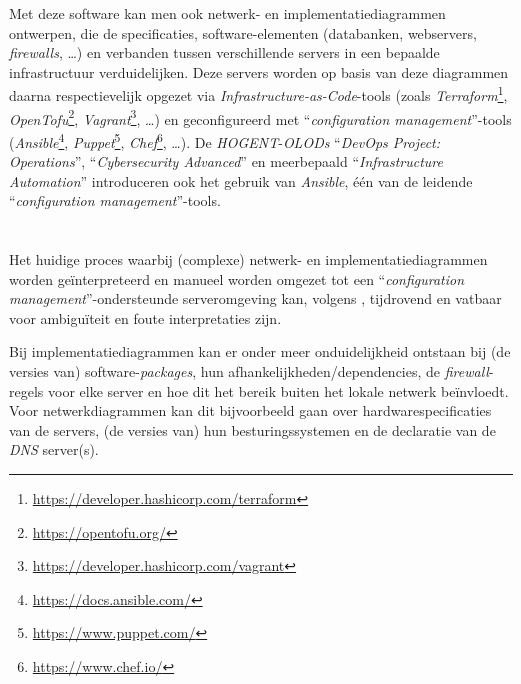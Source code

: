 Met deze software kan men ook netwerk- en implementatiediagrammen ontwerpen, die de specificaties, software-elementen (databanken, webservers, \emph{firewalls}, \ldots) en verbanden tussen verschillende servers in een bepaalde infrastructuur verduidelijken. Deze servers worden op basis van deze diagrammen daarna respectievelijk opgezet via \emph{Infrastructure-as-Code}-tools (zoals \emph{Terraform}\footnote{\url{https://developer.hashicorp.com/terraform}}, \emph{OpenTofu}\footnote{\url{https://opentofu.org/}}, \emph{Vagrant}\footnote{\url{https://developer.hashicorp.com/vagrant}}, \ldots) en geconfigureerd met ``\emph{configuration management}''-tools (\emph{Ansible}\footnote{\url{https://docs.ansible.com/}}, \emph{Puppet}\footnote{\url{https://www.puppet.com/}}, \emph{Chef}\footnote{\url{https://www.chef.io/}}, \ldots). De \emph{HOGENT}-\emph{OLODs} ``\emph{DevOps Project: Operations}'', ``\emph{Cybersecurity Advanced}'' en meerbepaald ``\emph{Infrastructure Automation}'' introduceren ook het gebruik van \emph{Ansible}, één van de leidende ``\emph{configuration management}''-tools.

\section{}%
\label{sec:inl_probleemstelling}


Het huidige proces waarbij (complexe) netwerk- en implementatiediagrammen worden geïnterpreteerd en manueel worden omgezet tot een ``\emph{configuration management}''-ondersteunde serveromgeving kan, volgens \textcite{Nicacio2020}, tijdrovend en vatbaar voor ambiguïteit en foute interpretaties zijn.

Bij implementatiediagrammen kan er onder meer onduidelijkheid ontstaan bij (de versies van) software-\emph{packages}, hun afhankelijkheden/dependencies, de \emph{firewall}-regels voor elke server en hoe dit het bereik buiten het lokale netwerk beïnvloedt.
Voor netwerkdiagrammen kan dit bijvoorbeeld gaan over hardwarespecificaties van de servers, (de versies van) hun besturingssystemen en de declaratie van de \emph{DNS} server(s).

